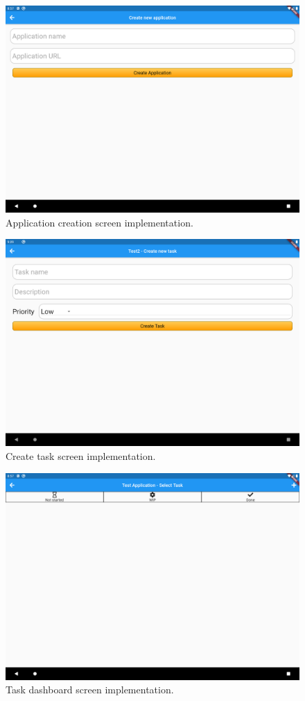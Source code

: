 \begin{figure}[H]
    \includegraphics[width=\textwidth]{Sprint_1/images/create_app_screen_app.png}
    \caption{Application creation screen implementation.}
    \label{app_creation_screen_app}
\end{figure}

\begin{figure}[H]
    \includegraphics[width=\textwidth]{Sprint_1/images/create_task_screen_app.png}
    \caption{Create task screen implementation.}
    \label{create_task_screen_app}

\end{figure}

\begin{figure}[H]
    \includegraphics[width=\textwidth]{Sprint_1/images/task_dashboard_screen_app.png}
    \caption{Task dashboard screen implementation.}
    \label{task_dashboard_screen_app}
\end{figure}
